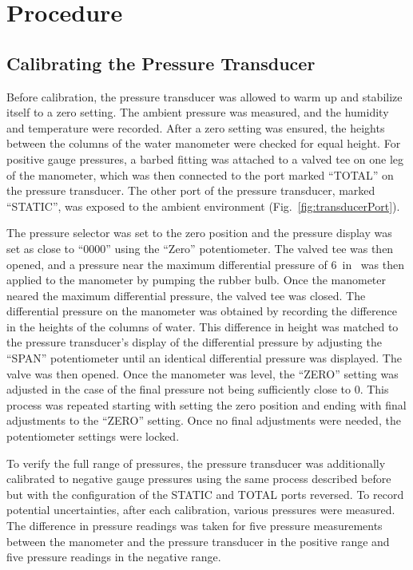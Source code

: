 \documentclass[journal,letterpaper]{IEEEtran}
\begin{document}
\section{Procedure}

\subsection{Calibrating the Pressure Transducer}

Before calibration, the pressure transducer was allowed to warm up and stabilize itself to a zero setting.
The ambient pressure was measured, and the humidity and temperature were recorded.
After a zero setting was ensured, the heights between the columns of the water manometer were checked for equal height.
For positive gauge pressures, a barbed fitting was attached to a valved tee on one leg of the manometer, which was then connected to the port marked ``TOTAL'' on the pressure transducer.
The other port of the pressure transducer, marked ``STATIC'', was exposed to the ambient environment (Fig.~\ref{fig:transducerPort}).

The pressure selector was set to the zero position and the pressure display was set as close to ``0000'' using the ``Zero'' potentiometer.
The valved tee was then opened, and a pressure near the maximum differential pressure of \qty{6}{in} was then applied to the manometer by pumping the rubber bulb.
Once the manometer neared the maximum differential pressure, the valved tee was closed.
The differential pressure on the manometer was obtained by recording the difference in the heights of the columns of water.
This difference in height was matched to the pressure transducer's display of the differential pressure by adjusting the ``SPAN'' potentiometer until an identical differential pressure was displayed.
The valve was then opened.
Once the manometer was level, the ``ZERO'' setting was adjusted in the case of the final pressure not being sufficiently close to 0.
This process was repeated starting with setting the zero position and ending with final adjustments to the ``ZERO'' setting.
Once no final adjustments were needed, the potentiometer settings were locked.

To verify the full range of pressures, the pressure transducer was additionally calibrated to negative gauge pressures using the same process described before but with the configuration of the STATIC and TOTAL ports reversed.
To record potential uncertainties, after each calibration, various pressures were measured.
The difference in pressure readings was taken for five pressure measurements between the manometer and the pressure transducer in the positive range and five pressure readings in the negative range.
\end{document}
